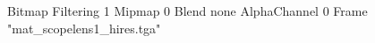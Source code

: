 {Bitmap
	{Filtering 1}
	{Mipmap 0}
	{Blend none}
	{AlphaChannel 0}
	{Frame "mat_scopelens1_hires.tga"}
}
